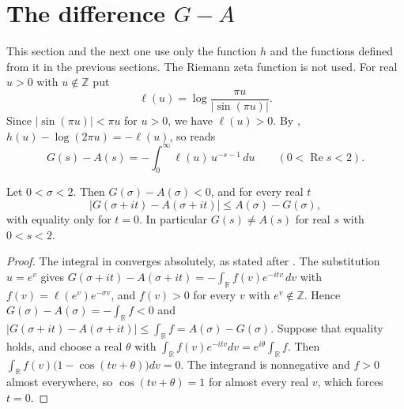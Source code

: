\clearpage
\section{The difference $G-A$}\label{sec:GA}

This section and the next one use only the function $h$ and the functions defined from it in the previous sections. The Riemann zeta function is not used. For real $u>0$ with $u\notin\mathbb Z$ put
\begin{equation}\label{eq:ell}
\ell(u)=\log\frac{\pi u}{|\sin(\pi u)|} .
\end{equation}
Since $|\sin(\pi u)|<\pi u$ for $u>0$, we have $\ell(u)>0$. By , $h(u)-\log(2\pi u)=-\ell(u)$, so  reads
\begin{equation}\label{eq:GAell}
G(s)-A(s)=-\int_0^\infty\ell(u)\,u^{-s-1}\,du\qquad(0<\operatorname{Re}s<2).
\end{equation}

\begin{proposition}\label{prop:GAbound}
Let $0<\sigma<2$. Then $G(\sigma)-A(\sigma)<0$, and for every real $t$
\begin{equation}\label{eq:GAbound}
|G(\sigma+it)-A(\sigma+it)|\le A(\sigma)-G(\sigma),
\end{equation}
with equality only for $t=0$. In particular $G(s)\ne A(s)$ for real $s$ with $0<s<2$.
\end{proposition}

\begin{proof}
The integral in  converges absolutely, as stated after . The substitution $u=e^v$ gives $G(\sigma+it)-A(\sigma+it)=-\int_{\mathbb R}f(v)e^{-itv}\,dv$ with $f(v)=\ell(e^v)e^{-\sigma v}$, and $f(v)>0$ for every $v$ with $e^v\notin\mathbb Z$. Hence $G(\sigma)-A(\sigma)=-\int_{\mathbb R}f<0$ and $|G(\sigma+it)-A(\sigma+it)|\le\int_{\mathbb R}f=A(\sigma)-G(\sigma)$. Suppose that equality holds, and choose a real $\theta$ with $\int_{\mathbb R}f(v)e^{-itv}dv=e^{i\theta}\int_{\mathbb R}f$. Then $\int_{\mathbb R}f(v)\bigl(1-\cos(tv+\theta)\bigr)dv=0$. The integrand is nonnegative and $f>0$ almost everywhere, so $\cos(tv+\theta)=1$ for almost every real $v$, which forces $t=0$.
\end{proof}

